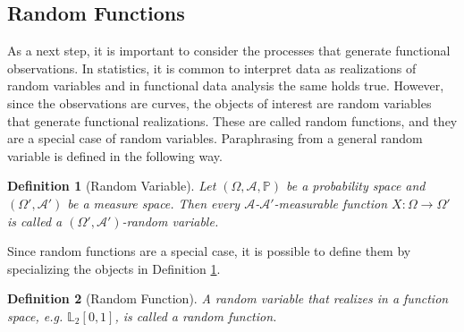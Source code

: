 \documentclass[12pt, a4paper]{article}
\theoremstyle{MAstyle} \newtheorem{assumption}{Assumption}[section]
\theoremstyle{MAstyle} \newtheorem{definition}{Definition}[section]
\theoremstyle{MAstyle} \newtheorem{theorem}{Theorem}[section]
\begin{document}
		\subsection{Random Functions}
			As a next step, it is important to consider the processes that generate functional observations. In statistics, it is common to interpret data as realizations of random variables and in functional data analysis the same holds true. However, since the observations are curves, the objects of interest are random variables that generate functional realizations. These are called random functions, and they are a special case of random variables. Paraphrasing from \cite{bauer_probability_2011} a general random variable is defined in the following way.
			\begin{definition}[Random Variable]\label{rand_var}
				Let $\left(\Omega, \mathcal{A}, \mathbb{P}\right)$ be a probability space and $\left(\Omega', \mathcal{A}'\right)$ be a measure space. Then every $\mathcal{A}$-$\mathcal{A}'$-measurable function $X:\Omega \rightarrow \Omega'$ is called a $\left(\Omega', \mathcal{A}'\right)$-random variable.
			\end{definition}
			Since random functions are a special case, it is possible to define them by specializing the objects in Definition \ref{rand_var}.
			\begin{definition}[Random Function]
				A random variable that realizes in a function space, e.g. $\mathbb{L}_2[0,1]$, is called a random function.
			\end{definition}
		
\end{document}

